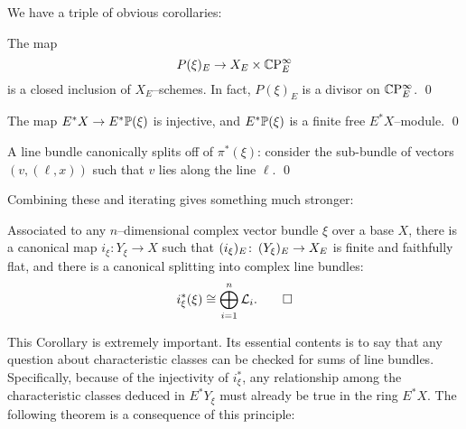 We have a triple of obvious corollaries:
\begin{corollary}
The map \[P(\xi)_E \to X_E \times \CP^\infty_E\] is a closed inclusion of $X_E$--schemes.  In fact, $P(\xi)_E$ is a divisor on $\CP^\infty_E$. \qed
\end{corollary}
\begin{corollary}
The map $E^* X \to E^* \P(\xi)$ is injective, and $E^* \P(\xi)$ is a finite free $E^* X$--module. \qed
\end{corollary}
\begin{corollary}
A line bundle canonically splits off of $\pi^*(\xi)$: consider the sub-bundle of vectors $(v, (\ell, x))$ such that $v$ lies along the line $\ell$. \qed
\end{corollary}

\noindent Combining these and iterating gives something much stronger:

\begin{corollary}
Associated to any $n$--dimensional complex vector bundle $\xi$ over a base $X$, there is a canonical map $i_\xi: Y_\xi \to X$ such that $(i_\xi)_E\co (Y_\xi)_E \to X_E$ is finite and faithfully flat, and there is a canonical splitting into complex line bundles: \[i_\xi^*(\xi) \cong \bigoplus_{i=1}^n \L_i. \qed\]
\end{corollary}

This Corollary is extremely important.  Its essential contents is to say that any question about characteristic classes can be checked for sums of line bundles.  Specifically, because of the injectivity of $i_\xi^*$, any relationship among the characteristic classes deduced in $E^* Y_\xi$ must already be true in the ring $E^* X$.  The following theorem is a consequence of this principle:

